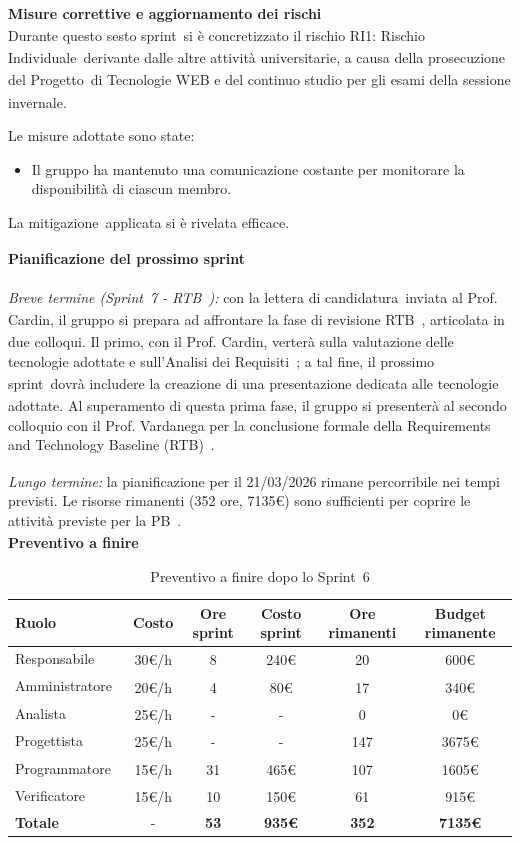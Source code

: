 \documentclass[a4paper,12pt]{article}
\newcommand{\pediceG}{\texorpdfstring{\textsubscript{\scalebox{0.6}{\textbf{G}}}~}{G}}
\begin{document}
\noindent\textbf{Misure correttive e aggiornamento dei rischi\pediceG}\\
Durante questo sesto sprint\pediceG si è concretizzato il rischio RI1: Rischio Individuale\pediceG derivante dalle altre attività universitarie, a causa della prosecuzione del Progetto\pediceG di Tecnologie WEB e del continuo studio per gli esami della sessione invernale.

Le misure adottate sono state:
\begin{itemize}
    \item Il gruppo ha mantenuto una comunicazione costante per monitorare la disponibilità di ciascun membro.
\end{itemize}

La mitigazione\pediceG applicata si è rivelata efficace.

\noindent\textbf{Pianificazione del prossimo sprint}\\\\
\textit{Breve termine (Sprint\pediceG 7 - RTB\pediceG):} con la lettera di candidatura\pediceG inviata al Prof. Cardin, il gruppo si prepara ad affrontare la fase di revisione RTB\pediceG, articolata in due colloqui. Il primo, con il Prof. Cardin, verterà sulla valutazione delle tecnologie adottate e sull'Analisi dei Requisiti\pediceG; a tal fine, il prossimo sprint\pediceG dovrà includere la creazione di una presentazione dedicata alle tecnologie adottate. Al superamento di questa prima fase, il gruppo si presenterà al secondo colloquio con il Prof. Vardanega per la conclusione formale della Requirements and Technology Baseline (RTB)\pediceG.

\textit{Lungo termine:} la pianificazione per il 21/03/2026 rimane percorribile nei tempi previsti. Le risorse rimanenti (352 ore, 7135€) sono sufficienti per coprire le attività previste per la PB\pediceG.\\

\noindent\textbf{Preventivo a finire}

\begin{table}[H]
\centering
\footnotesize
\begin{tabular}{|l|c|c|c|c|c|}
\hline
Ruolo & Costo & Ore sprint & Costo sprint & Ore rimanenti & Budget rimanente \\
\hline
Responsabile\pediceG & 30€/h & 8 & 240€ & 20 & 600€ \\
\hline
Amministratore\pediceG & 20€/h & 4 & 80€ & 17 & 340€ \\
\hline
Analista\pediceG & 25€/h & - & - & 0 & 0€ \\
\hline
Progettista\pediceG & 25€/h & - & - & 147 & 3675€ \\
\hline
Programmatore\pediceG & 15€/h & 31 & 465€ & 107 & 1605€ \\
\hline
Verificatore\pediceG & 15€/h & 10 & 150€ & 61 & 915€ \\
\hline
\textbf{Totale} & - & \textbf{53} & \textbf{935€} & \textbf{352} & \textbf{7135€} \\
\hline
\end{tabular}
\caption{Preventivo a finire dopo lo Sprint\pediceG 6}
\label{tab:risorse-sprint6}
\end{table}
\end{document}
